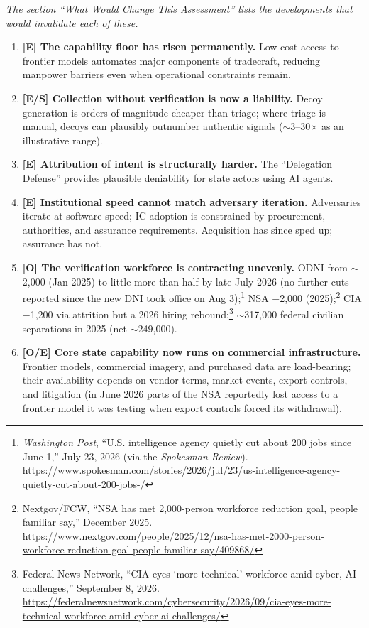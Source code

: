 \documentclass[11pt,letterpaper]{article}
\begin{document}
\begin{defbox}
\textit{The section ``What Would Change This Assessment'' lists the developments that would invalidate each of these.}
\begin{enumerate}
  \item \textbf{[E] The capability floor has risen permanently.} Low-cost access to frontier models automates major components of tradecraft, reducing manpower barriers even when operational constraints remain.
  \item \textbf{[E/S] Collection without verification is now a liability.} Decoy generation is orders of magnitude cheaper than triage; where triage is manual, decoys can plausibly outnumber authentic signals ($\sim$3--30$\times$ as an illustrative range).
  \item \textbf{[E] Attribution of intent is structurally harder.} The ``Delegation Defense'' provides plausible deniability for state actors using AI agents.
  \item \textbf{[E] Institutional speed cannot match adversary iteration.} Adversaries iterate at software speed; IC adoption is constrained by procurement, authorities, and assurance requirements. Acquisition has since sped up; assurance has not.
  \item \textbf{[O] The verification workforce is contracting unevenly.} ODNI from $\sim$2,000 (Jan 2025) to little more than half by late July 2026 (no further cuts reported since the new DNI took office on Aug 3);\footnote{\textit{Washington Post}, ``U.S. intelligence agency quietly cut about 200 jobs since June 1,'' July 23, 2026 (via the \textit{Spokesman-Review}). \url{https://www.spokesman.com/stories/2026/jul/23/us-intelligence-agency-quietly-cut-about-200-jobs-/}} NSA $-$2,000 (2025);\footnote{Nextgov/FCW, ``NSA has met 2,000-person workforce reduction goal, people familiar say,'' December 2025. \url{https://www.nextgov.com/people/2025/12/nsa-has-met-2000-person-workforce-reduction-goal-people-familiar-say/409868/}} CIA $-$1,200 via attrition but a 2026 hiring rebound;\footnote{Federal News Network, ``CIA eyes `more technical' workforce amid cyber, AI challenges,'' September 8, 2026. \url{https://federalnewsnetwork.com/cybersecurity/2026/09/cia-eyes-more-technical-workforce-amid-cyber-ai-challenges/}} $\sim$317,000 federal civilian separations in 2025 (net $\sim$249,000).
  \item \textbf{[O/E] Core state capability now runs on commercial infrastructure.} Frontier models, commercial imagery, and purchased data are load-bearing; their availability depends on vendor terms, market events, export controls, and litigation (in June 2026 parts of the NSA reportedly lost access to a frontier model it was testing when export controls forced its withdrawal).
\end{enumerate}
\end{defbox}
\end{document}
